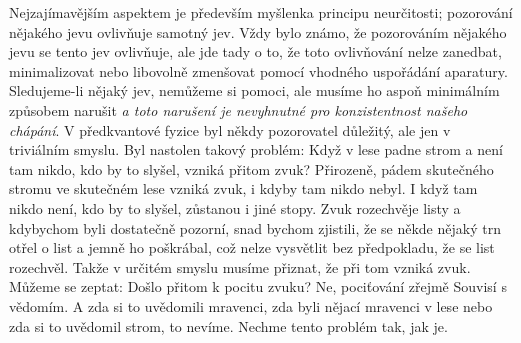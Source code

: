     Nejzajímavějším aspektem je především myšlenka principu neurčitosti; pozorování nějakého jevu
    ovlivňuje samotný jev. Vždy bylo známo, že pozorováním nějakého jevu se tento jev ovlivňuje, ale
    jde tady o to, že toto ovlivňování nelze zanedbat, minimalizovat nebo libovolně zmenšovat pomocí
    vhodného uspořádání aparatury. Sledujeme-li nějaký jev, nemůžeme si pomoci, ale musíme ho aspoň
    minimálním způsobem narušit \emph{a toto narušení je nevyhnutné pro konzistentnost našeho
    chápání}. V předkvantové fyzice byl někdy pozorovatel důležitý, ale jen v triviálním smyslu. Byl
    nastolen takový problém: Když v lese padne strom a není tam nikdo, kdo by to slyšel, vzniká
    přitom zvuk? Přirozeně, pádem skutečného stromu ve skutečném lese vzniká zvuk, i kdyby tam nikdo
    nebyl. I když tam nikdo není, kdo by to slyšel, zůstanou i jiné stopy. Zvuk rozechvěje listy a
    kdybychom byli dostatečně pozorní, snad bychom zjistili, že se někde nějaký trn otřel o list a
    jemně ho poškrábal, což nelze vysvětlit bez předpokladu, že se list rozechvěl. Takže v určitém
    smyslu musíme přiznat, že při tom vzniká zvuk. Můžeme se zeptat: Došlo přitom k pocitu zvuku?
    Ne, pociťování zřejmě Souvisí s vědomím. A zda si to uvědomili mravenci, zda byli nějací
    mravenci v lese nebo zda si to uvědomil strom, to nevíme. Nechme tento problém tak, jak je. 
    
